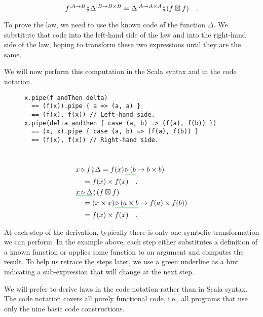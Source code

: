 ~\vspace{-0.3\baselineskip}
\[
f^{:A\rightarrow B}\bef\Delta^{:B\rightarrow B\times B}=\Delta^{:A\rightarrow A\times A}\bef(f\boxtimes f)\quad.
\]

\noindent To prove the law, we need to use the known code of the function
$\Delta$. We substitute that code into the left-hand side of the
law and into the right-hand side of the law, hoping to transform these
two expressions until they are the same.

We will now perform this computation in the Scala syntax and in the
code notation.

\begin{wrapfigure}{L}{0.6\columnwidth}%
\vspace{-0.6\baselineskip}
\begin{lstlisting}
x.pipe(f andThen delta)
  == (f(x)).pipe { a => (a, a) }
  == (f(x), f(x)) // Left-hand side.
x.pipe(delta andThen { case (a, b) => (f(a), f(b)) })
  == (x, x).pipe { case (a, b) => (f(a), f(b)) }
  == (f(x), f(x)) // Right-hand side.
\end{lstlisting}
\vspace{-3\baselineskip}
\end{wrapfigure}%

~\vspace{-1.4\baselineskip}
\begin{align*}
 & x\triangleright f\bef\Delta=f(x)\,\gunderline{\triangleright\,(b}\rightarrow b\times b)\\
 & \quad=f(x)\times f(x)\quad.\\
 & \gunderline{x\triangleright\Delta}\bef(f\boxtimes f)\\
 & \quad=(x\times x)\gunderline{\,\triangleright\,(a\times b}\rightarrow f(a)\times f(b))\\
 & \quad=f(x)\times f(x)\quad.
\end{align*}
\vspace{-1.5\baselineskip}

At each step of the derivation, typically there is only one symbolic
transformation we can perform. In the example above, each step either
substitutes a definition of a known function or applies some function
to an argument and computes the result. To help us retrace the steps
later, we use a green underline as a hint indicating a sub-expression
that will change at the next step. 

We will prefer to derive laws in the code notation rather than in
Scala syntax. The code notation covers all purely functional code,
i.e., all programs that use only the nine basic code constructions.

